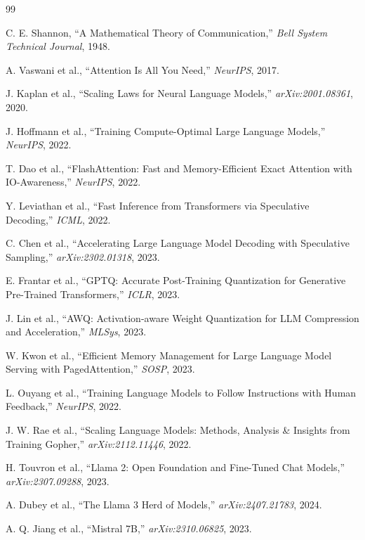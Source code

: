 \documentclass[11pt,a4paper]{book}
\theoremstyle{definition}
\begin{document}
\newpage
\begin{thebibliography}{99}

	 C. E. Shannon, ``A Mathematical Theory of Communication,'' \emph{Bell System Technical Journal}, 1948.

	 A. Vaswani et al., ``Attention Is All You Need,'' \emph{NeurIPS}, 2017.

	 J. Kaplan et al., ``Scaling Laws for Neural Language Models,'' \emph{arXiv:2001.08361}, 2020.

	 J. Hoffmann et al., ``Training Compute-Optimal Large Language Models,'' \emph{NeurIPS}, 2022.

	 T. Dao et al., ``FlashAttention: Fast and Memory-Efficient Exact Attention with IO-Awareness,'' \emph{NeurIPS}, 2022.

	 Y. Leviathan et al., ``Fast Inference from Transformers via Speculative Decoding,'' \emph{ICML}, 2022.

	 C. Chen et al., ``Accelerating Large Language Model Decoding with Speculative Sampling,'' \emph{arXiv:2302.01318}, 2023.

	 E. Frantar et al., ``GPTQ: Accurate Post-Training Quantization for Generative Pre-Trained Transformers,'' \emph{ICLR}, 2023.

	 J. Lin et al., ``AWQ: Activation-aware Weight Quantization for LLM Compression and Acceleration,'' \emph{MLSys}, 2023.

	 W. Kwon et al., ``Efficient Memory Management for Large Language Model Serving with PagedAttention,'' \emph{SOSP}, 2023.

	 L. Ouyang et al., ``Training Language Models to Follow Instructions with Human Feedback,'' \emph{NeurIPS}, 2022.

	 J. W. Rae et al., ``Scaling Language Models: Methods, Analysis \& Insights from Training Gopher,'' \emph{arXiv:2112.11446}, 2022.

	 H. Touvron et al., ``Llama 2: Open Foundation and Fine-Tuned Chat Models,'' \emph{arXiv:2307.09288}, 2023.

	 A. Dubey et al., ``The Llama 3 Herd of Models,'' \emph{arXiv:2407.21783}, 2024.

	 A. Q. Jiang et al., ``Mistral 7B,'' \emph{arXiv:2310.06825}, 2023.


\end{thebibliography}
\end{document}
